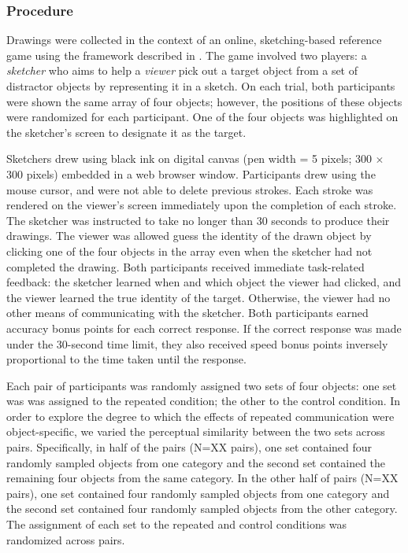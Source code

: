 \documentclass[10pt,letterpaper]{article}
\begin{document}
\subsubsection{Procedure} 


Drawings were collected in the context of an online, sketching-based reference game using the framework described in . 
The game involved two players: a \textit{sketcher} who aims to help a \textit{viewer} pick out a target object from a set of distractor objects by representing it in a sketch. 
On each trial, both participants were shown the same array of four objects; however, the positions of these objects were randomized for each participant. 
One of the four objects was highlighted on the sketcher's screen to designate it as the target.

Sketchers drew using black ink on digital canvas (pen width = 5 pixels; 300 $\times$ 300 pixels) embedded in a web browser window. 
Participants drew using the mouse cursor, and were not able to delete previous strokes. Each stroke was rendered on the viewer's screen immediately upon the completion of each stroke. 
The sketcher was instructed to take no longer than 30 seconds to produce their drawings. 
The viewer was allowed guess the identity of the drawn object by clicking one of the four objects in the array even when the sketcher had not completed the drawing. 
Both participants received immediate task-related feedback: the sketcher learned when and which object the viewer had clicked, and the viewer learned the true identity of the target. 
Otherwise, the viewer had no other means of communicating with the sketcher. 
Both participants earned accuracy bonus points for each correct response. 
If the correct response was made under the 30-second time limit, they also received speed bonus points inversely proportional to the time taken until the response.



Each pair of participants was randomly assigned two sets of four objects: one set was was assigned to the repeated condition; the other to the control condition.
In order to explore the degree to which the effects of repeated communication were object-specific, we varied the perceptual similarity between the two sets across pairs. 
Specifically, in half of the pairs (N=XX pairs), one set contained four randomly sampled objects from one category and the second set contained the remaining four objects from the same category. 
In the other half of pairs (N=XX pairs), one set contained four randomly sampled objects from one category and the second set contained four randomly sampled objects from the other category.
The assignment of each set to the repeated and control conditions was randomized across pairs. 
\end{document}
